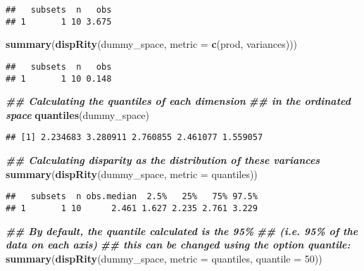 \documentclass[
]{book}
\newenvironment{Shaded}{\begin{snugshade}}{\end{snugshade}}
\newcommand{\AttributeTok}[1]{\textcolor[rgb]{0.13,0.29,0.53}{#1}}
\newcommand{\DecValTok}[1]{\textcolor[rgb]{0.00,0.00,0.81}{#1}}
\newcommand{\DocumentationTok}[1]{\textcolor[rgb]{0.56,0.35,0.01}{\textbf{\textit{#1}}}}
\newcommand{\FunctionTok}[1]{\textcolor[rgb]{0.13,0.29,0.53}{\textbf{#1}}}
\newcommand{\NormalTok}[1]{#1}
\begin{document}
\begin{verbatim}
##   subsets  n   obs
## 1       1 10 3.675
\end{verbatim}

\begin{Shaded}
\begin{Highlighting}[]
\FunctionTok{summary}\NormalTok{(}\FunctionTok{dispRity}\NormalTok{(dummy\_space, }\AttributeTok{metric =} \FunctionTok{c}\NormalTok{(prod, variances)))}
\end{Highlighting}
\end{Shaded}

\begin{verbatim}
##   subsets  n   obs
## 1       1 10 0.148
\end{verbatim}

\begin{Shaded}
\begin{Highlighting}[]
\DocumentationTok{\#\# Calculating the quantiles of each dimension}
\DocumentationTok{\#\# in the ordinated space}
\FunctionTok{quantiles}\NormalTok{(dummy\_space)}
\end{Highlighting}
\end{Shaded}

\begin{verbatim}
## [1] 2.234683 3.280911 2.760855 2.461077 1.559057
\end{verbatim}

\begin{Shaded}
\begin{Highlighting}[]
\DocumentationTok{\#\# Calculating disparity as the distribution of these variances}
\FunctionTok{summary}\NormalTok{(}\FunctionTok{dispRity}\NormalTok{(dummy\_space, }\AttributeTok{metric =}\NormalTok{ quantiles))}
\end{Highlighting}
\end{Shaded}

\begin{verbatim}
##   subsets  n obs.median  2.5%   25%   75% 97.5%
## 1       1 10      2.461 1.627 2.235 2.761 3.229
\end{verbatim}

\begin{Shaded}
\begin{Highlighting}[]
\DocumentationTok{\#\# By default, the quantile calculated is the 95\%}
\DocumentationTok{\#\# (i.e. 95\% of the data on each axis)}
\DocumentationTok{\#\# this can be changed using the option quantile:}
\FunctionTok{summary}\NormalTok{(}\FunctionTok{dispRity}\NormalTok{(dummy\_space, }\AttributeTok{metric =}\NormalTok{ quantiles, }\AttributeTok{quantile =} \DecValTok{50}\NormalTok{))}
\end{Highlighting}
\end{Shaded}
\end{document}
